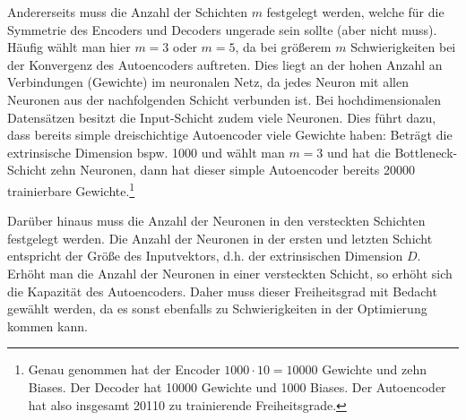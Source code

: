 Andererseits muss die Anzahl der Schichten $m$ festgelegt werden, welche für die Symmetrie des
Encoders und Decoders ungerade sein sollte (aber nicht muss). Häufig wählt man hier $m = 3$ oder $m
	= 5$, da bei größerem $m$ Schwierigkeiten bei der Konvergenz des Autoencoders auftreten. Dies liegt
an der hohen Anzahl an Verbindungen (Gewichte) im neuronalen Netz, da jedes Neuron mit allen
Neuronen aus der nachfolgenden Schicht verbunden ist. Bei hochdimensionalen Datensätzen besitzt die
Input-Schicht zudem viele Neuronen. Dies führt dazu, dass bereits simple dreischichtige Autoencoder
viele Gewichte haben: Beträgt die extrinsische Dimension bspw. 1000 und wählt man $m=3$ und hat die
Bottleneck-Schicht zehn Neuronen, dann hat dieser simple Autoencoder bereits \num{20000}
trainierbare Gewichte.\footnote{Genau genommen hat der Encoder $1000 \cdot 10 = \num{10000}$
	Gewichte und zehn Biases. Der Decoder hat \num{10000} Gewichte und \num{1000} Biases. Der
	Autoencoder hat also insgesamt \num{20110} zu trainierende Freiheitsgrade.}

Darüber hinaus muss die Anzahl der Neuronen in den versteckten Schichten festgelegt werden. Die
Anzahl der Neuronen in der ersten und letzten Schicht entspricht der Größe des Inputvektors, d.h.
der extrinsischen Dimension $D$. Erhöht man die Anzahl der Neuronen in einer versteckten Schicht,
so erhöht sich die Kapazität des Autoencoders. Daher muss dieser Freiheitsgrad mit Bedacht gewählt
werden, da es sonst ebenfalls zu Schwierigkeiten in der Optimierung kommen kann.

